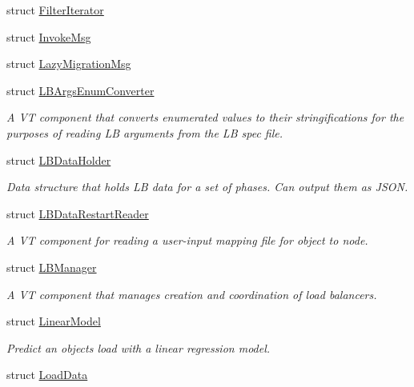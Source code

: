 \begin{DoxyCompactItemize}
\item 
struct \hyperlink{structvt_1_1vrt_1_1collection_1_1balance_1_1_filter_iterator}{Filter\+Iterator}
\item 
struct \hyperlink{structvt_1_1vrt_1_1collection_1_1balance_1_1_invoke_msg}{Invoke\+Msg}
\item 
struct \hyperlink{structvt_1_1vrt_1_1collection_1_1balance_1_1_lazy_migration_msg}{Lazy\+Migration\+Msg}
\item 
struct \hyperlink{structvt_1_1vrt_1_1collection_1_1balance_1_1_l_b_args_enum_converter}{L\+B\+Args\+Enum\+Converter}
\begin{DoxyCompactList}\small\item\em A VT component that converts enumerated values to their stringifications for the purposes of reading LB arguments from the LB spec file. \end{DoxyCompactList}\item 
struct \hyperlink{structvt_1_1vrt_1_1collection_1_1balance_1_1_l_b_data_holder}{L\+B\+Data\+Holder}
\begin{DoxyCompactList}\small\item\em Data structure that holds LB data for a set of phases. Can output them as J\+S\+ON. \end{DoxyCompactList}\item 
struct \hyperlink{structvt_1_1vrt_1_1collection_1_1balance_1_1_l_b_data_restart_reader}{L\+B\+Data\+Restart\+Reader}
\begin{DoxyCompactList}\small\item\em A VT component for reading a user-\/input mapping file for object to node. \end{DoxyCompactList}\item 
struct \hyperlink{structvt_1_1vrt_1_1collection_1_1balance_1_1_l_b_manager}{L\+B\+Manager}
\begin{DoxyCompactList}\small\item\em A VT component that manages creation and coordination of load balancers. \end{DoxyCompactList}\item 
struct \hyperlink{structvt_1_1vrt_1_1collection_1_1balance_1_1_linear_model}{Linear\+Model}
\begin{DoxyCompactList}\small\item\em Predict an object\textquotesingle{}s load with a linear regression model. \end{DoxyCompactList}\item 
struct \hyperlink{structvt_1_1vrt_1_1collection_1_1balance_1_1_load_data}{Load\+Data}

\end{DoxyCompactItemize}

